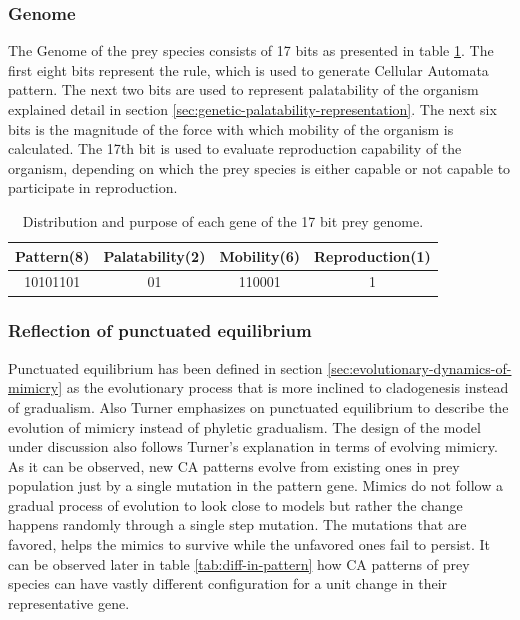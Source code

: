 \documentclass[letterpaper]{article}
\numberwithin{equation}{section}
\begin{document}
\subsubsection{Genome}
The Genome of the prey species consists of 17 bits as presented in table \ref{tab:prey-genome}. The first eight bits represent the rule, which is used to generate Cellular Automata pattern. The next two bits are used to represent palatability of the organism explained detail in section \ref{sec:genetic-palatability-representation}. The next six bits is the magnitude of the force with which mobility of the organism is calculated. The 17th bit is used to evaluate reproduction capability of the organism, depending on which the prey species is either capable or not capable to participate in reproduction.

\begin{table}[H]
\centering
\begin{tabular}{|c|c|c|c|}
	\hline
		\textbf{Pattern(8)} & \textbf{Palatability(2)} & \textbf{Mobility(6)} & \textbf{Reproduction(1)} \\ \hline
		10101101					 	& 							01		 		 & 			110001					&					1						 		 \\ \hline
\end{tabular}
\caption{Distribution and purpose of each gene of the 17 bit prey genome.}
\label{tab:prey-genome}
\end{table}

\subsubsection{Reflection of punctuated equilibrium}
\label{subsec:reflection-of-punctuated-equilibrium}
Punctuated equilibrium has been defined in section \ref{sec:evolutionary-dynamics-of-mimicry} as the evolutionary process that is more inclined to cladogenesis instead of gradualism. Also Turner \cite{turner1988} emphasizes on punctuated equilibrium to describe the evolution of mimicry instead of phyletic gradualism. The design of the model under discussion also follows Turner's explanation in terms of evolving mimicry. As it can be observed, new CA patterns evolve from existing ones in prey population just by a single mutation in the pattern gene. Mimics do not follow a gradual process of evolution to look close to models but rather the change happens randomly through a single step mutation. The mutations that are favored, helps the mimics to survive while the unfavored ones fail to persist. It can be observed later in table \ref{tab:diff-in-pattern} how CA patterns of prey species can have vastly different configuration for a unit change in their representative gene. 
\end{document}
